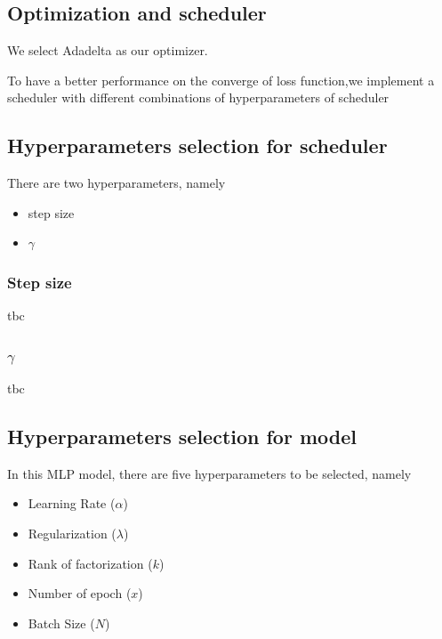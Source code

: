 \documentclass[final]{cvpr}
\begin{document}



\subsection{Optimization and scheduler}
We select Adadelta as our optimizer. 

To have a better performance on the converge of loss function,we implement a scheduler with different combinations of hyperparameters of scheduler
\subsection{Hyperparameters selection for scheduler}
There are two hyperparameters, namely
\begin{itemize}
    \item step size
    \item $\gamma$
\end{itemize}

\subsubsection{Step size}
tbc

\subsubsection{$\gamma$}
tbc

\subsection{Hyperparameters selection for model}
In this MLP model, there are five hyperparameters to be selected, namely
\begin{itemize}
	\item Learning Rate ($\alpha$)
	\item Regularization ($\lambda$)
	\item Rank of factorization ($k$)
	\item Number of epoch ($x$)
	\item Batch Size ($N$)
\end{itemize}
\end{document}
